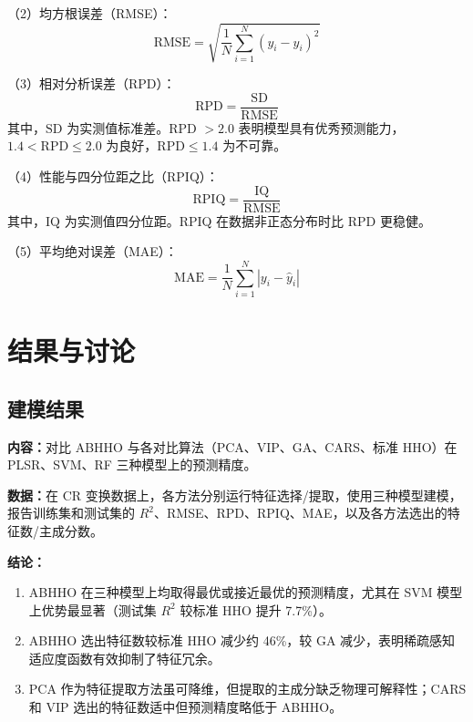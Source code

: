 \documentclass[12pt,a4paper]{article}
\newcommand{\rmse}{\mathrm{RMSE}}
\newcommand{\rpd}{\mathrm{RPD}}
\newcommand{\rpiq}{\mathrm{RPIQ}}
\newcommand{\mae}{\mathrm{MAE}}
\begin{document}
（2）均方根误差（RMSE）：
\begin{equation}
    \rmse = \sqrt{\frac{1}{N}\sum_{i=1}^{N}(y_i - \hat{y}_i)^2}
    \label{eq:rmse}
\end{equation}

（3）相对分析误差（RPD）：
\begin{equation}
    \rpd = \frac{\mathrm{SD}}{\rmse}
    \label{eq:rpd}
\end{equation}
其中，$\mathrm{SD}$ 为实测值标准差。RPD $> 2.0$ 表明模型具有优秀预测能力，$1.4 < \mathrm{RPD} \leq 2.0$ 为良好，$\mathrm{RPD} \leq 1.4$ 为不可靠。

（4）性能与四分位距之比（RPIQ）：
\begin{equation}
    \rpiq = \frac{\mathrm{IQ}}{\rmse}
    \label{eq:rpiq}
\end{equation}
其中，$\mathrm{IQ}$ 为实测值四分位距。RPIQ 在数据非正态分布时比 RPD 更稳健。

（5）平均绝对误差（MAE）：
\begin{equation}
    \mae = \frac{1}{N}\sum_{i=1}^{N}|y_i - \hat{y}_i|
    \label{eq:mae}
\end{equation}


\section{结果与讨论}
\label{sec:results}


\subsection{建模结果}

\textbf{内容：}对比 ABHHO 与各对比算法（PCA、VIP、GA、CARS、标准 HHO）在 PLSR、SVM、RF 三种模型上的预测精度。

\textbf{数据：}在 CR 变换数据上，各方法分别运行特征选择/提取，使用三种模型建模，报告训练集和测试集的 $R^2$、RMSE、RPD、RPIQ、MAE，以及各方法选出的特征数/主成分数。

\textbf{结论：}
\begin{enumerate}
    \item ABHHO 在三种模型上均取得最优或接近最优的预测精度，尤其在 SVM 模型上优势最显著（测试集 $R^2$ 较标准 HHO 提升 7.7\%）。
    \item ABHHO 选出特征数较标准 HHO 减少约 46\%，较 GA 减少，表明稀疏感知适应度函数有效抑制了特征冗余。
    \item PCA 作为特征提取方法虽可降维，但提取的主成分缺乏物理可解释性；CARS 和 VIP 选出的特征数适中但预测精度略低于 ABHHO。
\end{enumerate}
\end{document}
